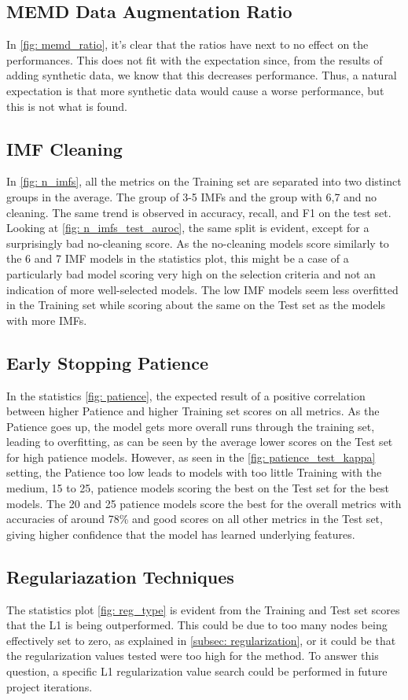 \subsection{MEMD Data Augmentation Ratio}
In \autoref{fig: memd_ratio}, it's clear that the ratios have next to no effect on the performances. This does not fit with the expectation since, from the results of adding synthetic data, we know that this decreases performance. Thus, a natural expectation is that more synthetic data would cause a worse performance, but this is not what is found. 
\subsection{IMF Cleaning}
In \autoref{fig: n_imfs}, all the metrics on the Training set are separated into two distinct groups in the average. The group of 3-5 IMFs and the group with 6,7 and no cleaning. The same trend is observed in accuracy, recall, and F1 on the test set. Looking at \autoref{fig: n_imfs_test_auroc}, the same split is evident, except for a surprisingly bad no-cleaning score. As the no-cleaning models score similarly to the 6 and 7 IMF models in the statistics plot, this might be a case of a particularly bad model scoring very high on the selection criteria and not an indication of more well-selected models. The low IMF models seem less overfitted in the Training set while scoring about the same on the Test set as the models with more IMFs.

\subsection{Early Stopping Patience}
In the statistics \autoref{fig: patience}, the expected result of a positive correlation between higher Patience and higher Training set scores on all metrics. As the Patience goes up, the model gets more overall runs through the training set, leading to overfitting, as can be seen by the average lower scores on the Test set for high patience models. However, as seen in the \autoref{fig: patience_test_kappa} setting, the Patience too low leads to models with too little Training with the medium, 15 to 25, patience models scoring the best on the Test set for the best models. The 20 and 25 patience models score the best for the overall metrics with accuracies of around 78\% and good scores on all other metrics in the Test set, giving higher confidence that the model has learned underlying features. 

\subsection{Regulariazation Techniques}
The statistics plot \autoref{fig: reg_type} is evident from the Training and Test set scores that the L1 is being outperformed. This could be due to too many nodes being effectively set to zero, as explained in \autoref{subsec: regularization}, or it could be that the regularization values tested were too high for the method. To answer this question, a specific L1 regularization value search could be performed in future project iterations.


